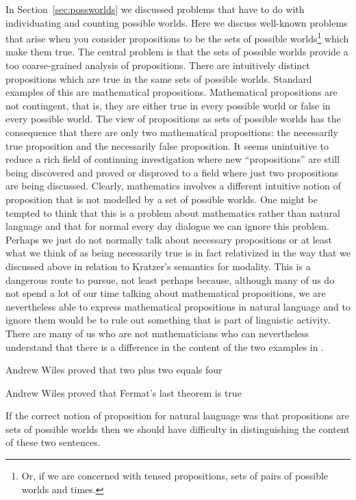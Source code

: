 In Section~\ref{sec:possworlds} we discussed problems that have to do
with individuating and counting possible worlds.  Here we discuss
well-known problems that arise when you consider propositions to be
the sets of possible worlds\footnote{Or, if we are concerned with
  tensed propositions, sets of pairs of possible worlds and times.} which make them true.  The central problem is that the sets of
possible worlds provide a too coarse-grained analysis of
propositions.  There are intuitively distinct propositions which are
true in the same sets of possible worlds.  Standard examples of this
are mathematical propositions.  Mathematical propositions are not
contingent, that is, they are either true in every possible world or
false in every possible world.  The view of propositions as sets of
possible worlds has the consequence that there
are only two mathematical propositions: the necessarily true
proposition and the necessarily false proposition.  It seems
unintuitive to reduce a rich field of continuing investigation where
new ``propositions'' are still being discovered and proved or
disproved to a field where just two propositions are being discussed.
Clearly, mathematics involves a different intuitive notion of
proposition that is not modelled by a set of possible worlds.  One
might be tempted to think that this is a problem about mathematics
rather than natural language and that for normal every day dialogue we
can ignore this problem.  Perhaps we just do not normally talk about
necessary propositions or at least what we think of as being
necessarily true is in fact relativized in the way that we discussed
above in relation to Kratzer's semantics for modality.  This is a
dangerous route to pursue, not least perhaps because, although many of
us do not spend a lot of our time talking about mathematical
propositions, we are nevertheless able to express mathematical
propositions in natural language and to ignore them would be to rule
out something that is part of linguistic activity.  There are many of
us who are not mathematicians who can nevertheless understand that
there is a difference in the content of the two examples in \nexteg{}.
\begin{ex} 
\begin{subex} 
 
\item Andrew Wiles proved that two plus two equals four 
 
\item Andrew Wiles proved that Fermat's last theorem is true 
 
\end{subex} 
   
\end{ex} 
If the correct notion of proposition for natural language was that
propositions are sets of possible worlds then we should have
difficulty in distinguishing the content of these two sentences.

